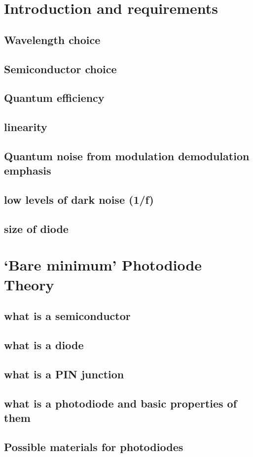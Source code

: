 \section{Introduction and requirements}
\subsection{Wavelength choice}
\subsection{Semiconductor choice}
\subsection{Quantum efficiency}
\subsection{linearity}
\subsection{Quantum noise from modulation demodulation emphasis}
\subsection{low levels of dark noise (1/f)}
\subsection{size of diode}
\section{`Bare minimum' Photodiode Theory}
\subsection{what is a semiconductor}
\subsection{what is a diode}
\subsection{what is a PIN junction}
\subsection{what is a photodiode and basic properties of them}
\subsection{Possible materials for photodiodes}
